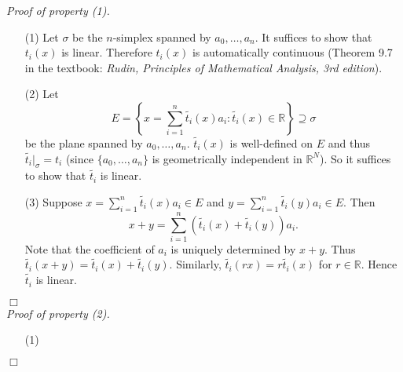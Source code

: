 \documentclass{article}
\begin{document}
\emph{Proof of property (1).}
\begin{enumerate}
\item[(1)]
  Let $\sigma$ be the $n$-simplex spanned by $a_0, \ldots, a_n$.
  It suffices to show that $t_i(x)$ is linear.
  Therefore $t_i(x)$ is automatically continuous
  (Theorem 9.7 in the textbook: \emph{Rudin, Principles of Mathematical Analysis, 3rd edition}).

\item[(2)]
  Let
  \[
    E
    =
    \left\{ x = \sum_{i=1}^{n} \widetilde{t_i}(x) a_i : \widetilde{t_i}(x) \in \mathbb{R} \right\}
    \supseteq \sigma
  \]
  be the plane spanned by $a_0, \ldots, a_n$.
  $\widetilde{t_i}(x)$ is well-defined on $E$ and thus $\widetilde{t_i}|_\sigma = t_i$
  (since $\{a_0, \ldots, a_n\}$ is geometrically independent in $\mathbb{R}^{N}$).
  So it suffices to show that $\widetilde{t_i}$ is linear.

\item[(3)]
  Suppose $x = \sum_{i=1}^{n} \widetilde{t_i}(x) a_i \in E$
  and $y = \sum_{i=1}^{n} \widetilde{t_i}(y) a_i \in E$.
  Then
  \[
    x + y = \sum_{i=1}^{n} (\widetilde{t_i}(x) + \widetilde{t_i}(y)) a_i.
  \]
  Note that the coefficient of $a_i$ is uniquely determined by $x + y$.
  Thus $\widetilde{t_i}(x+y) = \widetilde{t_i}(x) + \widetilde{t_i}(y)$.
  Similarly, $\widetilde{t_i}(rx) = r\widetilde{t_i}(x)$ for $r \in \mathbb{R}$.
  Hence $\widetilde{t_i}$ is linear.
\end{enumerate}
$\Box$ \\



\emph{Proof of property (2).}
\begin{enumerate}
\item[(1)]
\end{enumerate}
$\Box$ \\
\end{document}
